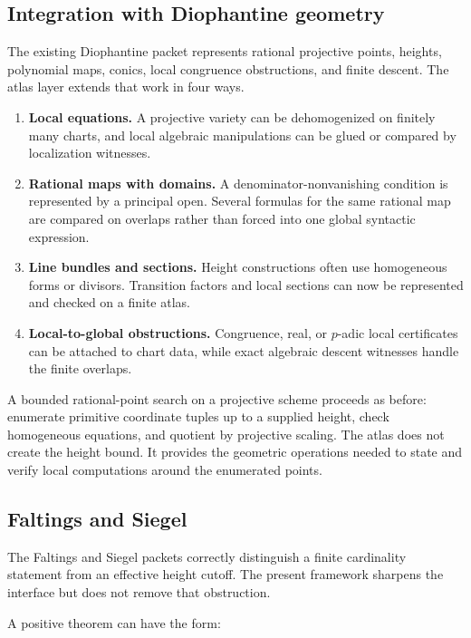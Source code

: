 \subsection{Integration with Diophantine geometry}

The existing Diophantine packet represents rational projective points, heights, polynomial maps,
conics, local congruence obstructions, and finite descent.  The atlas layer extends that work in four
ways.

\begin{enumerate}[label=\arabic*.]
\item \textbf{Local equations.}  A projective variety can be dehomogenized on finitely many charts,
      and local algebraic manipulations can be glued or compared by localization witnesses.
\item \textbf{Rational maps with domains.}  A denominator-nonvanishing condition is represented by a
      principal open.  Several formulas for the same rational map are compared on overlaps rather
      than forced into one global syntactic expression.
\item \textbf{Line bundles and sections.}  Height constructions often use homogeneous forms or
      divisors.  Transition factors and local sections can now be represented and checked on a
      finite atlas.
\item \textbf{Local-to-global obstructions.}  Congruence, real, or $p$-adic local certificates can be
      attached to chart data, while exact algebraic descent witnesses handle the finite overlaps.
\end{enumerate}

A bounded rational-point search on a projective scheme proceeds as before: enumerate primitive
coordinate tuples up to a supplied height, check homogeneous equations, and quotient by projective
scaling.  The atlas does not create the height bound.  It provides the geometric operations needed
to state and verify local computations around the enumerated points.

\subsection{Faltings and Siegel}

The Faltings and Siegel packets correctly distinguish a finite cardinality statement from an
effective height cutoff.  The present framework sharpens the interface but does not remove that
obstruction.

A positive theorem can have the form:

